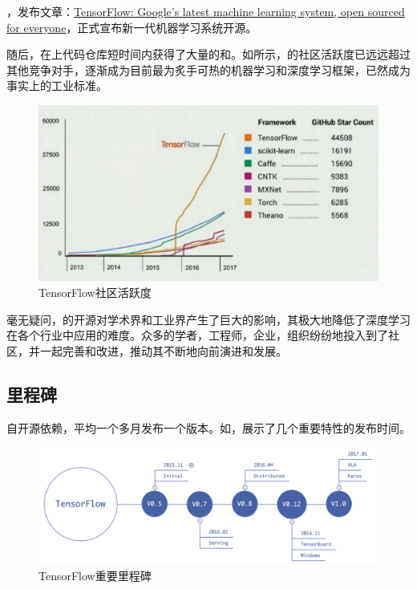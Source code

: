 \begin{content}

，发布文章：\href{https://research.googleblog.com/2015/11/tensorflow-googles-latest-machine\_9.html}{TensorFlow: Google's latest machine learning system, open sourced for everyone}，正式宣布新一代机器学习系统开源。

随后，在上代码仓库短时间内获得了大量的和。如所示，的社区活跃度已远远超过其他竞争对手，逐渐成为目前最为炙手可热的机器学习和深度学习框架，已然成为事实上的工业标准。

\begin{figure}[!htbp]
\centering
\includegraphics[width=1.0\textwidth]{figures/tf-commits.png}
\caption{TensorFlow社区活跃度}
 \label{fig:tf-commits}
\end{figure}

毫无疑问，的开源对学术界和工业界产生了巨大的影响，其极大地降低了深度学习在各个行业中应用的难度。众多的学者，工程师，企业，组织纷纷地投入到了社区，并一起完善和改进，推动其不断地向前演进和发展。

\end{content}

\subsection{里程碑}

\begin{content}

\tf{}自开源依赖，平均一个多月发布一个版本。如，展示了\tf{}几个重要特性的发布时间。

\begin{figure}[!htbp]
\centering
\includegraphics[width=1.0\textwidth]{figures/tf-versions.png}
\caption{TensorFlow重要里程碑}
 \label{fig:tf-versions}
\end{figure}

\end{content}

